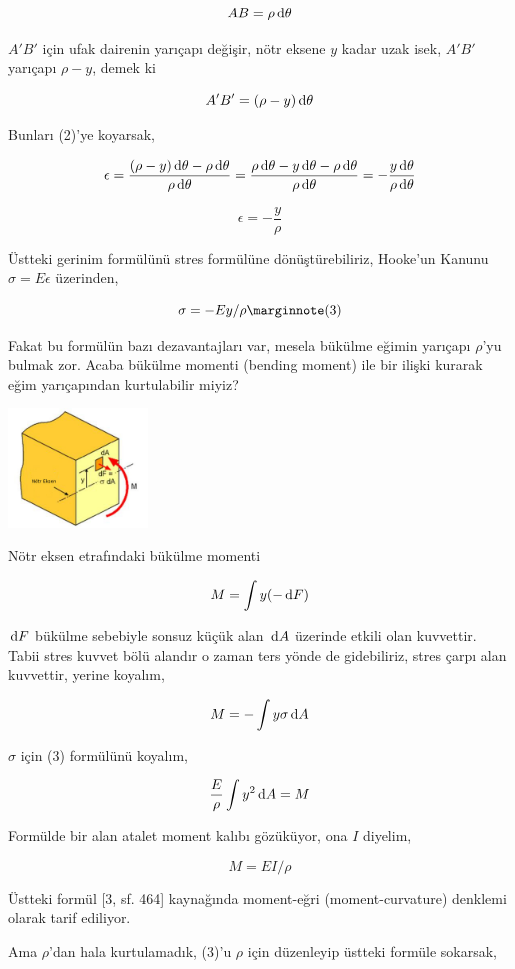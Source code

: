 \documentclass[12pt,fleqn]{article}\usepackage{../../common}
\begin{document}
$$
AB = \rho \,\mathrm{d} \theta
$$

$A'B'$ için ufak dairenin yarıçapı değişir, nötr eksene $y$ kadar uzak isek,
$A'B'$ yarıçapı $\rho - y$, demek ki 

$$
A'B' = (\rho - y) \,\mathrm{d} \theta
$$

Bunları (2)'ye koyarsak,

$$
\epsilon = \frac{(\rho - y) \,\mathrm{d} \theta - \rho \,\mathrm{d} \theta}{\rho \,\mathrm{d}\theta} =
\frac{\rho \,\mathrm{d}\theta - y \,\mathrm{d}\theta - \rho \,\mathrm{d}\theta}{\rho \,\mathrm{d}\theta} =
- \frac{y \,\mathrm{d}\theta}{\rho \,\mathrm{d}\theta}
$$

$$
\epsilon = - \frac{y}{\rho}
$$

Üstteki gerinim formülünü stres formülüne dönüştürebiliriz, Hooke'un Kanunu
$\sigma = E \epsilon$ üzerinden,

$$
\sigma = -E y / \rho
\mlabel{3}
$$

Fakat bu formülün bazı dezavantajları var, mesela bükülme eğimin yarıçapı
$\rho$'yu bulmak zor. Acaba bükülme momenti (bending moment) ile bir ilişki
kurarak eğim yarıçapından kurtulabilir miyiz?

\includegraphics[width=10em]{phy_020_strs_00_05.jpg}

Nötr eksen etrafındaki bükülme momenti

$$
M = \int y (-\,\mathrm{d} F)
$$


$\,\mathrm{d} F$ bükülme sebebiyle sonsuz küçük alan $\,\mathrm{d} A$ üzerinde etkili olan
kuvvettir. Tabii stres kuvvet bölü alandır o zaman ters yönde de gidebiliriz,
stres çarpı alan kuvvettir, yerine koyalım,

$$
M = -\int y \sigma \,\mathrm{d} A
$$

$\sigma$ için (3) formülünü koyalım,

$$
\frac{E}{\rho} \int y^2 \,\mathrm{d} A = M
$$

Formülde bir alan atalet moment kalıbı gözüküyor, ona $I$ diyelim,

$$
M = E I / \rho
$$

Üstteki formül [3, sf. 464] kaynağında moment-eğri (moment-curvature) denklemi
olarak tarif ediliyor.

Ama $\rho$'dan hala kurtulamadık, (3)'u $\rho$ için düzenleyip üstteki formüle
sokarsak,
\end{document}
